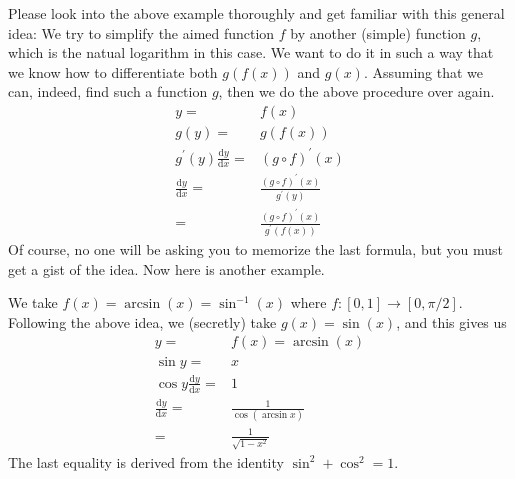 Please look into the above example thoroughly and get familiar with this general idea:
We try to simplify the aimed function $f$ by another (simple) function $g$, which is the natual logarithm in this case.
We want to do it in such a way that we know how to differentiate both $g(f(x))$ and $g(x)$.
Assuming that we can, indeed, find such a function $g$, then we do the above procedure over again.
\begin{align*}
    y=&f(x)\\
    g(y)=&g(f(x))\\
    g^\prime(y)\frac{\mathrm dy}{\mathrm dx}=&(g\circ f)^\prime(x)\\
    \frac{\mathrm dy}{\mathrm dx}=&\frac{(g\circ f)^\prime(x)}{g^\prime(y)}\\
    =&\frac{(g\circ f)^\prime(x)}{g^\prime(f(x))}
\end{align*}
Of course, no one will be asking you to memorize the last formula, but you must get a gist of the idea.
Now here is another example.
\begin{example}
    We take $f(x)=\arcsin(x)=\sin^{-1}(x)$ where $f:[0,1]\to[0,\pi/2]$.
    Following the above idea, we (secretly) take $g(x)=\sin(x)$, and this gives us
    \begin{align*}
        y=&f(x)=\arcsin(x)\\
        \sin y=&x\\
        \cos y\frac{\mathrm dy}{\mathrm dx}=&1\\
        \frac{\mathrm dy}{\mathrm dx}=&\frac{1}{\cos(\arcsin x)}\\
        =&\frac{1}{\sqrt{1-x^2}}
    \end{align*}
    The last equality is derived from the identity $\sin^2+\cos^2=1$.
\end{example}
